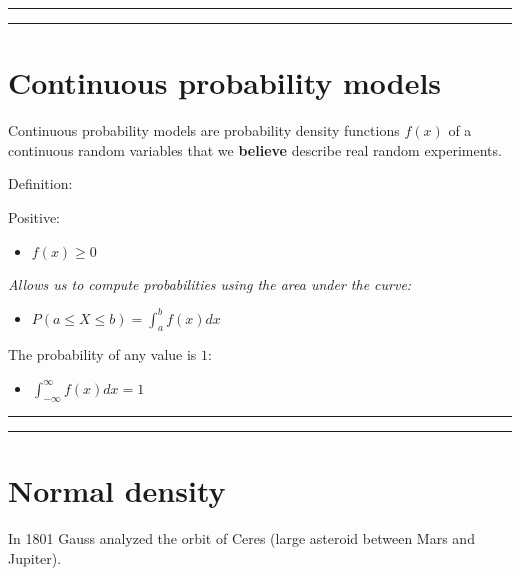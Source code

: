 \documentclass[
]{book}
\providecommand{\tightlist}{%
  \setlength{\itemsep}{0pt}\setlength{\parskip}{0pt}}
\begin{document}
\begin{center}\rule{0.5\linewidth}{0.5pt}\end{center}

\begin{center}\rule{0.5\linewidth}{0.5pt}\end{center}

\hypertarget{continuous-probability-models-1}{%
\section{Continuous probability models}\label{continuous-probability-models-1}}

Continuous probability models are probability density functions \(f(x)\) of a continuous random variables that we \textbf{believe} describe real random experiments.

Definition:

Positive:

\begin{itemize}
\tightlist
\item
  \(f(x) \geq 0\)
\end{itemize}

\emph{Allows us to compute probabilities using the area under the curve:}

\begin{itemize}
\tightlist
\item
  \(P(a\leq X \leq b)=\int_{a}^{b} f(x) dx\)
\end{itemize}

The probability of any value is \(1\):

\begin{itemize}
\tightlist
\item
  \(\int_{-\infty}^{\infty} f(x) dx = 1\)
\end{itemize}

\begin{center}\rule{0.5\linewidth}{0.5pt}\end{center}

\begin{center}\rule{0.5\linewidth}{0.5pt}\end{center}

\hypertarget{normal-density}{%
\section{Normal density}\label{normal-density}}

In 1801 Gauss analyzed the orbit of Ceres (large asteroid between Mars and Jupiter).
\end{document}
